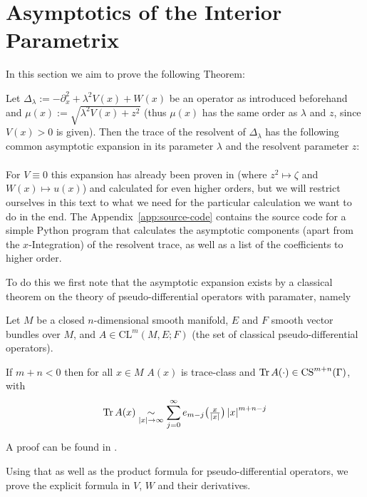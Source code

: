 \section{Asymptotics of the Interior Parametrix}
In this section we aim to prove the following Theorem:
\begin{MainTheorem}
  Let $\Delta_\lambda := -\partial_x^2 + \lambda^2V(x)+W(x)$ be an operator as
  introduced beforehand and $\mu(x) := \sqrt{\lambda^2 V(x) + z^2}$ (thus
  $\mu(x)$ has the same order as $\lambda$ and $z$, since $V(x) > 0$ is given).
  Then the trace of the resolvent of $\Delta_\lambda$ has the following common
  asymptotic expansion in its parameter $\lambda$ and the resolvent parameter
  $z$:
  \begin{align*}
    
  \end{align*}
  \begin{Remark}
    For $V\equiv 0$ this expansion has already been proven in \cite{gelfand}
    (where $z^2 \mapsto \zeta$ and $W(x) \mapsto u(x)$) and calculated for even
    higher orders, but we will restrict ourselves in this text to what we need
    for the particular calculation we want to do in the end.  The
    Appendix~\ref{app:source-code} contains the source code for a simple Python
    program that calculates the asymptotic components (apart from the
    $x$-Integration) of the resolvent trace, as well as a list of the
    coefficients to higher order.
  \end{Remark}
\end{MainTheorem}
To do this we first note that the asymptotic expansion exists by a classical
theorem on the theory of pseudo-differential operators with paramater, namely
\begin{Theorem}
  Let $M$ be a closed $n$-dimensional smooth manifold, $E$ and $F$ smooth
  vector bundles over $M$, and $A\in\mathrm{CL}^m(M,E; F)$ (the set of
  classical pseudo-differential operators).

  If $m+n<0$ then for all $x\in M$ $A(x)$ is trace-class and $\operatorname{Tr} A(\cdot)\in
  \mathrm{CS}^{m+n}(\Gamma)$, with
  \begin{align*}
    \operatorname{Tr} A(x)\mathrel{\underset{\left|x\right|\to\infty}{\sim}}
    \sum_{j=0}^{\infty} e_{m-j}\bigl(\tfrac{x}{\left|x\right|}\bigr)
    \left|x\right|^{m+n-j}
  \end{align*}
  \begin{Proof}
    A proof can be found in \cite{Lesch10}.
  \end{Proof}
\end{Theorem}
Using that as well as the product formula for pseudo-differential operators, we
prove the explicit formula in $V$, $W$ and their derivatives.


